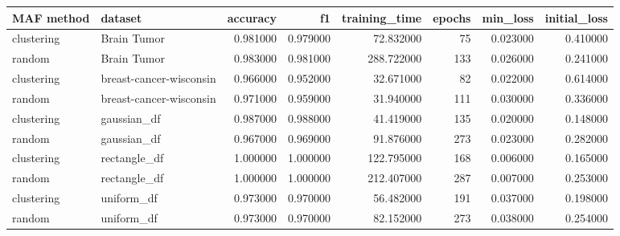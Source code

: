 \begin{tabular}{llrrrrrr}
\toprule
MAF method & dataset & accuracy & f1 & training_time & epochs & min_loss & initial_loss \\
\midrule
clustering & Brain Tumor & 0.981000 & 0.979000 & 72.832000 & 75 & 0.023000 & 0.410000 \\
random & Brain Tumor & 0.983000 & 0.981000 & 288.722000 & 133 & 0.026000 & 0.241000 \\
clustering & breast-cancer-wisconsin & 0.966000 & 0.952000 & 32.671000 & 82 & 0.022000 & 0.614000 \\
random & breast-cancer-wisconsin & 0.971000 & 0.959000 & 31.940000 & 111 & 0.030000 & 0.336000 \\
clustering & gaussian_df & 0.987000 & 0.988000 & 41.419000 & 135 & 0.020000 & 0.148000 \\
random & gaussian_df & 0.967000 & 0.969000 & 91.876000 & 273 & 0.023000 & 0.282000 \\
clustering & rectangle_df & 1.000000 & 1.000000 & 122.795000 & 168 & 0.006000 & 0.165000 \\
random & rectangle_df & 1.000000 & 1.000000 & 212.407000 & 287 & 0.007000 & 0.253000 \\
clustering & uniform_df & 0.973000 & 0.970000 & 56.482000 & 191 & 0.037000 & 0.198000 \\
random & uniform_df & 0.973000 & 0.970000 & 82.152000 & 273 & 0.038000 & 0.254000 \\
\bottomrule
\end{tabular}
